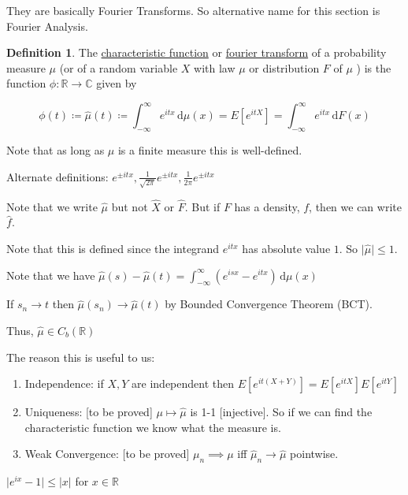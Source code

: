 \documentclass{article}
\theoremstyle{definition}
\newtheorem{definition}{Definition}
\begin{document}
They are basically Fourier Transforms. So alternative name for this section is Fourier Analysis.

\begin{definition}
    The \underline{characteristic function} or \underline{fourier transform} of a probability measure \(\mu\) (or of a random variable \(X\) with law \(\mu \) or distribution \(F\) of \(\mu \) ) is the function \(\phi:\mathbb{R}\to \mathbb{C}\) given by

    \[
        \boxed{\phi(t)\coloneqq \hat{\mu}(t)\coloneqq \int_{-\infty}^{\infty} e^{itx}  \,\mathrm{d}\mu (x) = E[e^{itX} ] = \int_{-\infty}^{\infty} e^{itx}  \,\mathrm{d}F(x)}
    \]

    Note that as long as \(\mu \) is a finite measure this is well-defined.

\end{definition}

Alternate definitions: \(e^{\pm itx}, \frac{1}{\sqrt{2\pi} }e^{\pm itx},\frac{1}{2\pi }e^{\pm itx}\) 

Note that we write \(\hat{\mu}\) but not \(\hat{X} \) or \(\hat{F}\). But if \(F\) has a density, \(f\), then we can write \(\hat{f}\).

Note that this is defined since the integrand \(e^{itx} \) has absolute value \(1\). So \(\vert \hat{\mu}  \vert \leq 1\).

Note that we have \(\hat{\mu}(s)-\hat{\mu}(t) = \int_{-\infty}^{\infty} (e^{isx} - e^{itx}  ) \,\mathrm{d}\mu(x) \) 

If \(s_n \to t\) then \(\hat{\mu}(s_n)\to \hat{\mu}(t)\) by Bounded Convergence Theorem (BCT).

Thus, \(\hat{\mu} \in C_b(\mathbb{R})\) 

The reason this is useful to us:

\begin{enumerate}
    \item Independence: if \(X,Y\) are independent then \(E[e^{it(X+Y)}]=E[e^{itX}]E[e^{itY}]\) 
    \item Uniqueness: [to be proved] \(\mu \mapsto \hat{\mu} \) is 1-1 [injective]. So if we can find the characteristic function we know what the measure is.
    \item Weak Convergence: [to be proved] \(\mu_n \implies \mu\) iff \(\hat{\mu}_n \to \hat{\mu} \) pointwise.
\end{enumerate}

\(\vert e^{ix} - 1 \vert \leq \vert x \vert \) for \(x\in \mathbb{R}\) 
\end{document}
